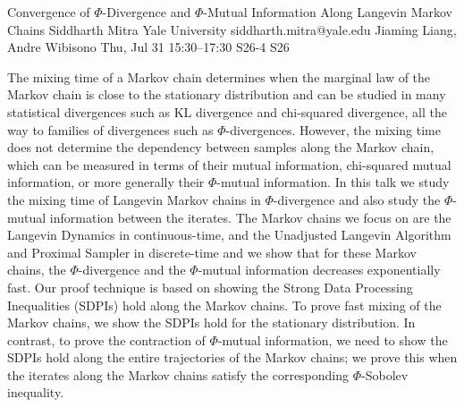\begin{talk}
  {Convergence of $\Phi$-Divergence and $\Phi$-Mutual Information Along Langevin Markov Chains}%
  {Siddharth Mitra}%
  {Yale University}%
  {siddharth.mitra@yale.edu}%
  {Jiaming Liang, Andre Wibisono}%
  {}%
  {Thu, Jul 31 15:30–17:30}%
  {S26-4}%
  {S26}%
  
				
			
The mixing time of a Markov chain determines when the marginal law of the Markov chain is close to the stationary distribution and can be studied in many statistical divergences such as KL divergence and chi-squared divergence, all the way to families of divergences such as $\Phi$-divergences. However, the mixing time does not determine the dependency between samples along the Markov chain, which can be measured in terms of their mutual information, chi-squared mutual information, or more generally their $\Phi$-mutual information. In this talk we study the mixing time of Langevin Markov chains in $\Phi$-divergence and also study the $\Phi$-mutual information between the iterates. The Markov chains we focus on are the Langevin Dynamics in continuous-time, and the Unadjusted Langevin Algorithm and Proximal Sampler in discrete-time and we show that for these Markov chains, the $\Phi$-divergence and the $\Phi$-mutual information decreases exponentially fast. Our proof technique is based on showing the Strong Data Processing Inequalities (SDPIs) hold along the Markov chains. To prove fast mixing of the Markov chains, we show the SDPIs hold for the stationary distribution. In contrast, to prove the contraction of $\Phi$-mutual information, we need to show the SDPIs hold along the entire trajectories of the Markov chains; we prove this when the iterates along the Markov chains satisfy the corresponding $\Phi$-Sobolev inequality.


\medskip


\end{talk}

